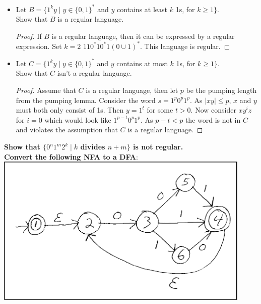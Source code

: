 \documentclass{article}
\begin{document}
        \begin{itemize}
            \item Let $B= \{1^ky\mid y\in \{0,1\}^*$ and $y$ contains at least $k$ 1s, for $k\geq 1\}$.\\
                  Show that $B$ is a regular language.
                  \begin{proof}
                      If $B$ is a regular language, then it can be expressed by a regular expression. Set $k=2$ $110^*10^*1(0\cup 1)^*$. This language is regular.
                  \end{proof}
            \item Let $C= \{1^k y\mid y\in \{0,1\}^* $ and $y$ contains at most $k$ 1s, for $k\geq 1\}$.\\
                  Show that $C$ isn't a regular language.
                  \begin{proof}
                      Assume that $C$ is a regular language, then let $p$ be the pumping length from the pumping lemma. Consider the word $s=1^p0^p1^p$. As $|xy|\leq p$, $x$ and $y$ must both only consist of 1s. Then $y=1^t$ for some $t>0$. Now consider $xy^iz$ for $i=0$ which would look like $1^{p-t}0^p1^p$. As $p-t<p$ the word is not in $C$ and violates the assumption that $C$ is a regular language.
                  \end{proof}
        \end{itemize}
    \textbf{Show that $\{0^n1^m2^k\mid k$ divides $n+m\}$ is not regular.}\\
    \textbf{Convert the following NFA to a DFA}:\\
    \includegraphics[scale=0.75]{machine}
\end{document}
